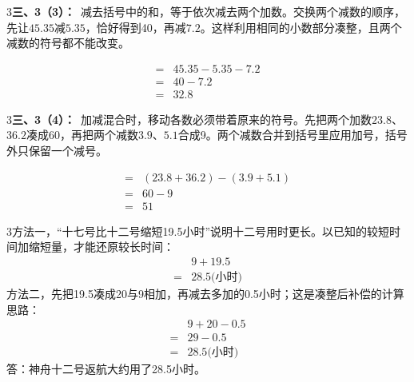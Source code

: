 \documentclass[multi=snippet,border={5bp 20bp 5bp 5bp}]{standalone}
\newenvironment{snippet}[3]{\begin{minipage}{#1bp}\color{answerred}\fontsize{#2}{#3}\selectfont\raggedright}{\end{minipage}}
\begin{document}
\begin{snippet}{505}{11.5}{14}\begin{multicols}{3}\raggedcolumns \textbf{三、3（3）：}\ 减去括号中的和，等于依次减去两个加数。交换两个减数的顺序，先让\(45.35\)\allowbreak 减\(5.35\)\allowbreak ，恰好得到40，再减\(7.2\)\allowbreak 。这样利用相同的小数部分凑整，且两个减数的符号都不能改变。\end{multicols}\end{snippet}
\begin{snippet}{208.00000000000003}{10.5}{12.8}\SourceSans\setlength{\mathindent}{2bp}\[\begin{aligned}={}&45.35-5.35-7.2\\={}&40-7.2\\={}&32.8\end{aligned}\]\end{snippet}
\begin{snippet}{505}{11.5}{14}\begin{multicols}{3}\raggedcolumns \textbf{三、3（4）：}\ 加减混合时，移动各数必须带着原来的符号。先把两个加数\(23.8\)\allowbreak 、\(36.2\)\allowbreak 凑成60，再把两个减数\(3.9\)\allowbreak 、\(5.1\)\allowbreak 合成9。两个减数合并到括号里应用加号，括号外只保留一个减号。\end{multicols}\end{snippet}
\begin{snippet}{279.0}{10.5}{12.8}\SourceSans\setlength{\mathindent}{2bp}\[\begin{aligned}={}&(23.8+36.2)-(3.9+5.1)\\={}&60-9\\={}&51\end{aligned}\]\end{snippet}
\begin{snippet}{505}{11.5}{14}\begin{multicols}{3}\raggedcolumns 方法一，“十七号比十二号缩短19.5小时”说明十二号用时更长。以已知的较短时间加缩短量，才能还原较长时间：\[\begin{aligned}&9+19.5\\={}&28.5\text{(小时)}\end{aligned}\]方法二，先把19.5凑成20与9相加，再减去多加的0.5小时；这是凑整后补偿的计算思路：\[\begin{aligned}&9+20-0.5\\={}&29-0.5\\={}&28.5\text{(小时)}\end{aligned}\]答：神舟十二号返航大约用了28.5小时。\end{multicols}\end{snippet}
\end{document}
